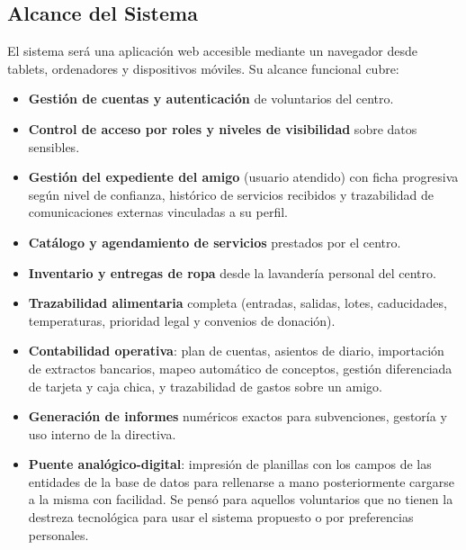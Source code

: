 \subsection{Alcance del Sistema}
El sistema será una aplicación web accesible mediante un navegador desde tablets,
ordenadores y dispositivos móviles. Su alcance funcional cubre:
\begin{itemize}
    \item \textbf{Gestión de cuentas y autenticación} de voluntarios del centro.
    
    \item \textbf{Control de acceso por roles y niveles de visibilidad} sobre datos sensibles.

    \item \textbf{Gestión del expediente del amigo} (usuario atendido) con ficha progresiva 
    según nivel de confianza, histórico de servicios recibidos y trazabilidad de
    comunicaciones externas vinculadas a su perfil.

    \item \textbf{Catálogo y agendamiento de servicios} prestados por el centro.
    
    \item \textbf{Inventario y entregas de ropa} desde la lavandería personal del centro.

    \item \textbf{Trazabilidad alimentaria} completa (entradas, salidas, lotes, caducidades,
    temperaturas, prioridad legal y convenios de donación).

    \item \textbf{Contabilidad operativa}: plan de cuentas, asientos de diario, importación
    de extractos bancarios, mapeo automático de conceptos, gestión diferenciada
    de tarjeta y caja chica, y trazabilidad de gastos sobre un amigo.

    \item \textbf{Generación de informes} numéricos exactos para subvenciones, gestoría y
    uso interno de la directiva.

    \item \textbf{Puente analógico-digital}: impresión de planillas con los campos de las
    entidades de la base de datos para rellenarse a mano posteriormente cargarse a la misma con facilidad. Se pensó para aquellos voluntarios 
    que no tienen la destreza tecnológica para usar el sistema propuesto o por preferencias personales.
\end{itemize}
\par
